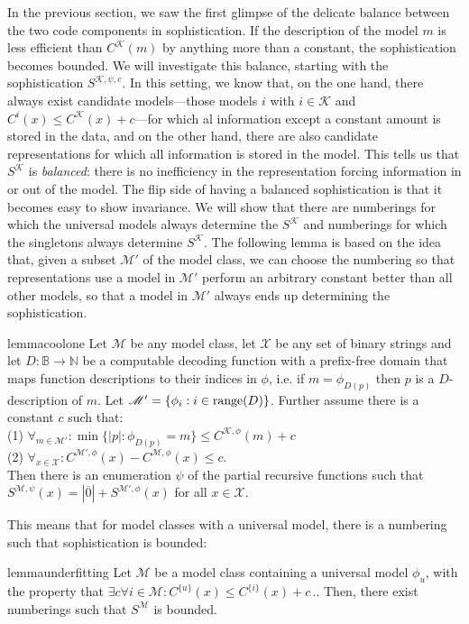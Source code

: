 \documentclass{style/llncs}
\newcommand{\M}{\mathscr M}
\newcommand{\K}{\mathscr K}
\newcommand{\X}{\mathscr X}
\newcommand{\B}{\mathbb B}
\newcommand{\N}{\mathbb N}
\newcommand{\tn}[1]{\textnormal{#1}}
\newcommand{\br}[1]{\overline{#1}}
\newcommand{\s}{S}
\newcommand{\p}{\,\text{.}}
\begin{document}
In the previous section, we saw the first glimpse of the delicate balance between the two code components in sophistication. If the description of the model $m$ is less efficient than $C^\K(m)$ by anything more than a constant, the sophistication becomes bounded. We will investigate this balance, starting with the sophistication $S^{\K,\psi,c}$. In this setting, we know that, on the one hand, there always exist candidate models---those models $i$ with $i \in \K$ and $C^{i}(x) \leq C^\K(x) + c$---for which al information except a constant amount is stored in the data, and on the other hand, there are also candidate representations for which all information is stored in the model. This tells us that $S^\K$ is \emph{balanced}: there is no inefficiency in the representation forcing information in or out of the model.
The flip side of having a balanced sophistication is that it becomes easy to show invariance. We will show that there are numberings for which the universal models always determine the $S^\K$ and numberings for which the singletons always determine $S^\K$. The following lemma is based on the idea that, given a subset $\M'$ of the model class, we can choose the numbering so that representations use a model in $\M'$ perform an arbitrary constant better than all other models, so that a model in $\M'$ always ends up determining the sophistication.
\begin{restatable}{lemma}{coolone}
\label{lemma:thecoolone}
  Let $\M$ be any model class, let $\X$ be any set of binary strings and let $D:\B\to\N$ be a computable decoding function with a prefix-free domain that maps function descriptions to their indices in $\phi$, i.e. if $m=\phi_{D(p)}$ then $p$ is a $D$-description of $m$. Let $\M'=\{\phi_i:i\in\tn{range}(D)\}$. Further assume there is a constant $c$ such that:\\
\-\hspace{1cm}(1) $\forall_{m\in\M'}:\min\{|p|:\phi_{D(p)}=m\}\le C^{\K,\phi}(m)+c$\\
\-\hspace{1cm}(2) $\forall_{x\in\X}:C^{\M',\phi}(x)-C^{\M,\phi}(x)\le c$.\\
Then there is an enumeration $\psi$ of the partial recursive functions such that $S^{\M,\psi}(x) = |\br{0}|+S^{\M',\phi}(x)$ for all $x\in\X$.
\end{restatable}
This means that for model classes with a universal model, there is a numbering such that sophistication is bounded:
\begin{restatable}[underfitting]{lemma}{underfitting}
Let $\M$ be a model class containing a universal model $\phi_u$, with the property that $\exists c \forall i \in \M : C^{\{u\}}(x) \leq C^{\{i\}}(x) + c \p$. Then, there exist numberings such that $\s^\M$ is bounded.
\end{restatable}
\end{document}
